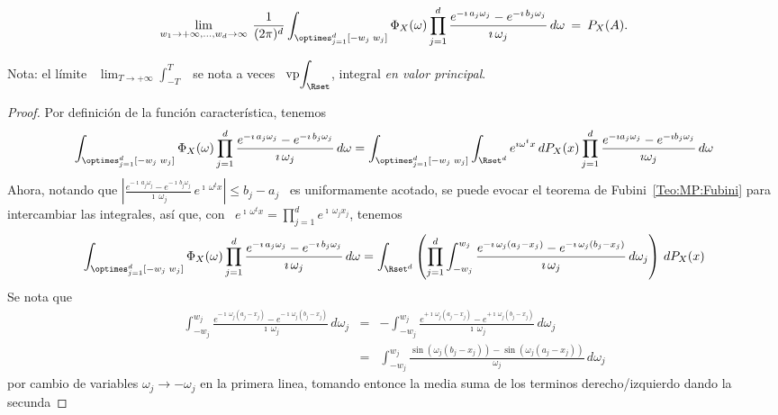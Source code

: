 {\begin{teorema}
  \[
  \lim_{w_1  \to   +\infty,\ldots,  w_d  \to  \infty}   \:  \frac{1}{(2  \pi)^d}
  \int_{\optimes_{j=1}^d   [-w_j  \;  w_j]}   \Phi_X(\omega)  \prod_{j   =  1}^d
  \frac{e^{- \imath \,  a_j \omega_j} - e^{- \imath  \, b_j \omega_j}}{\imath \,
    \omega_j} \, d\omega \: = \: P_X(A).
  \]
\end{teorema}
%
Nota: el l\'imite \ $\displaystyle\lim_{T  \to +\infty} \int_{-T}^T$ \ se nota a
veces \ $\displaystyle \operatorname{vp} \!  \int_\Rset$, integral {\it en valor
  principal}.
%
\begin{proof}
  Por definici\'on de la funci\'on caracter\'istica, tenemos
  \[
  \int_{\optimes_{j=1}^d   [-w_j  \;  w_j]} \Phi_X(\omega)  \prod_{j = 1}^d  \frac{e^{- \imath  \, a_j
      \omega_j} - e^{- \imath \, b_j \omega_j}}{\imath \, \omega_j} \, d\omega =
  \int_{\optimes_{j=1}^d   [-w_j  \;  w_j]} \int_{\Rset^d} e^{\imath  \omega^t x} \, dP_X(x) \prod_{j =
    1}^d  \frac{e^{- \imath a_j  \omega_j} -  e^{- \imath  b_j \omega_j}}{\imath
    \omega_j} \, d\omega
  \]
  Ahora, notando que $\left| \frac{e^{- \imath \, a_j \omega_j} - e^{- \imath \,
        b_j \omega_j}}{\imath  \, \omega_j} \, e^{\imath \,  \omega^t x} \right|
  \le  b_j - a_j$  \ es  uniformamente acotado,  se puede  evocar el  teorema de
  Fubini~\ref{Teo:MP:Fubini} para intercambiar las  integrales, as\'i que, con \
  $e^{\imath \, \omega^t x} = \prod_{j=1}^d e^{\imath \, \omega_j x_j}$, tenemos
  \[
  \int_{\optimes_{j=1}^d   [-w_j  \;  w_j]}   \Phi_X(\omega)  \prod_{j   =  1}^d
  \frac{e^{- \imath \,  a_j \omega_j} - e^{- \imath  \, b_j \omega_j}}{\imath \,
    \omega_j} \, d\omega = \int_{\Rset^d} \left( \prod_{j=1}^d \int_{-w_j}^{w_j}
    \frac{e^{- \imath \, \omega_j (a_j -  x_j)} - e^{- \imath \, \omega_j (b_j -
        x_j)}}{\imath \, \omega_j} \, d\omega_j \right) \, dP_X(x)
  \]
  Se nota que
  \begin{eqnarray*}
  \int_{-w_j}^{w_j} \frac{e^{- \imath \, \omega_j (a_j - x_j)} - e^{- \imath \, \omega_j
  (b_j - x_j)}}{\imath \, \omega_j} \, d\omega_j & = & - \int_{-w_j}^{w_j} \frac{e^{+
  \imath \, \omega_j (a_j - x_j)} - e^{+ \imath \, \omega_j (b_j - x_j)}}{\imath \,
  \omega_j} \, d\omega_j\\[2mm]
  & = & \int_{-w_j}^{w_j} \frac{\sin(\omega_j (b_j - x_j)) - \sin(\omega_j (a_j -
  x_j))}{\omega_j} \, d\omega_j
  \end{eqnarray*}
  por cambio de variables $\omega_j \to - \omega_j$ en la primera linea, tomando
  entonce  la media  suma de  los  terminos derecho/izquierdo  dando la  secunda

\end{proof}}

